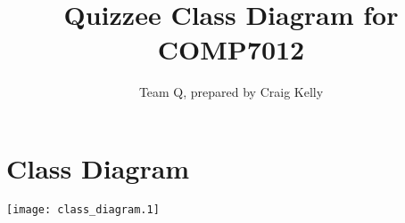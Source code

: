 \documentclass[letterpaper,10pt]{article}
\title{Quizzee Class Diagram for COMP7012}
\author{Team Q, prepared by Craig Kelly}
\begin{document}
\maketitle

\section{Class Diagram}

\texttt{[image: class\_diagram.1]}
\end{document}
